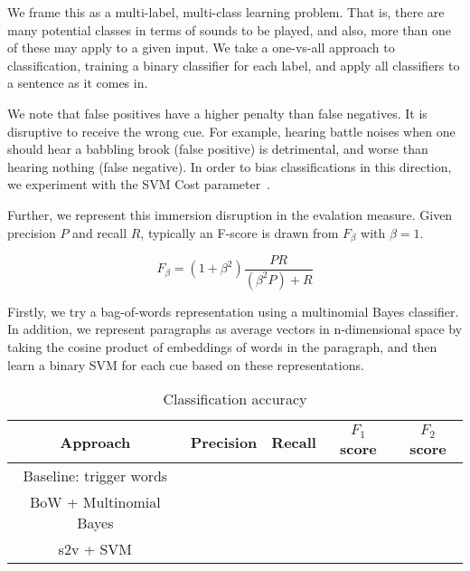 \documentclass[10pt,a4paper]{article}
\begin{document}
We frame this as a multi-label, multi-class learning problem.
That is, there are many potential classes in terms of sounds to be played, and also, more than one of these may apply to a given input.
We take a one-vs-all approach to classification, training a binary classifier for each label, and apply all classifiers to a sentence as it comes in.

We note that false positives have a higher penalty than false negatives.
It is disruptive to receive the wrong cue.
For example, hearing battle noises when one should hear a babbling brook (false positive) is detrimental, and worse than hearing nothing (false negative).
In order to bias classifications in this direction, we experiment with the SVM Cost parameter~\cite{morik1999combining}.

Further, we represent this immersion disruption in the evalation measure.
Given precision $P$ and recall $R$, typically an F-score is drawn from $F_\beta$ with $\beta=1$.

\begin{equation}
F_\beta = (1+\beta^2)\frac{PR}{(\beta^2 P) + R} 
\end{equation}


Firstly, we try a bag-of-words representation using a multinomial Bayes classifier.
In addition, we represent paragraphs as average vectors in n-dimensional space by taking the cosine product of embeddings of words in the paragraph, and then learn a binary SVM for each cue based on these representations.





\begin{table*}
\centering
\footnotesize
\begin{tabular}{c|cccc}
\hline
{\bf Approach} & {\bf Precision} & {\bf Recall} & {\bf $F_1$ score} & {\bf $F_2$ score} \\
\hline
Baseline: trigger words &&&& \\
BoW + Multinomial Bayes &&&& \\
s2v + SVM &&&& \\
\hline
\end{tabular}
\label{tab:results-main}
\caption{Classification accuracy}
\end{table*}
\end{document}
